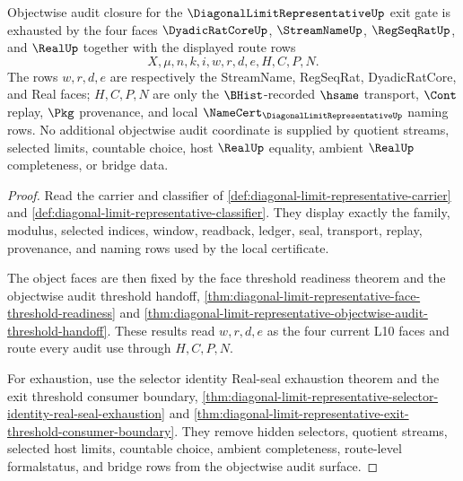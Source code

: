 \begin{theorem}
\label{thm:diagonal-limit-representative-objectwise-audit-closure}
Objectwise audit closure for the $\DiagonalLimitRepresentativeUp$ exit gate is exhausted by the four faces $\DyadicRatCoreUp$, $\StreamNameUp$, $\RegSeqRatUp$, and $\RealUp$ together with the displayed route rows
$$
X,\mu,n,k,i,w,r,d,e,H,C,P,N.
$$
The rows $w,r,d,e$ are respectively the StreamName, RegSeqRat, DyadicRatCore, and Real faces; $H,C,P,N$ are only the $\BHist$-recorded $\hsame$ transport, $\Cont$ replay, $\Pkg$ provenance, and local $\NameCert_{\DiagonalLimitRepresentativeUp}$ naming rows. No additional objectwise audit coordinate is supplied by quotient streams, selected limits, countable choice, host $\RealUp$ equality, ambient $\RealUp$ completeness, or bridge data.
\end{theorem}
\begin{proof}
Read the carrier and classifier of \autoref{def:diagonal-limit-representative-carrier} and \autoref{def:diagonal-limit-representative-classifier}. They display exactly the family, modulus, selected indices, window, readback, ledger, seal, transport, replay, provenance, and naming rows used by the local certificate.

The object faces are then fixed by the face threshold readiness theorem and the objectwise audit threshold handoff, \autoref{thm:diagonal-limit-representative-face-threshold-readiness} and \autoref{thm:diagonal-limit-representative-objectwise-audit-threshold-handoff}. These results read $w,r,d,e$ as the four current L10 faces and route every audit use through $H,C,P,N$.

For exhaustion, use the selector identity Real-seal exhaustion theorem and the exit threshold consumer boundary, \autoref{thm:diagonal-limit-representative-selector-identity-real-seal-exhaustion} and \autoref{thm:diagonal-limit-representative-exit-threshold-consumer-boundary}. They remove hidden selectors, quotient streams, selected host limits, countable choice, ambient completeness, route-level formalstatus, and bridge rows from the objectwise audit surface.
\end{proof}

